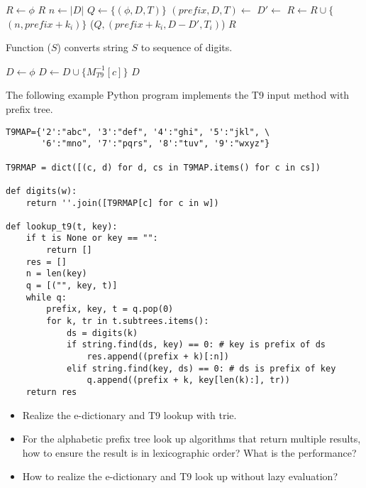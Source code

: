 \documentclass[b5paper]{article}
\begin{document}
\begin{algorithmic}[1]
  \State $R \gets \phi$
    \State \Return $R$
  \EndIf
  \State $n \gets |D|$
  \State $Q \gets \{(\phi, D, T)\}$
    \State $(prefix, D, T) \gets$ 
      \State $D' \gets$ 
       
        \State $R \gets R \cup \{$  $(n, prefix + k_i) \}$ 
        \State {}($Q, (prefix + k_i, D - D', T_i)$)
      \EndIf
    \EndFor
  \EndWhile
  \State \Return $R$
\EndFunction
\end{algorithmic}

Function ($S$) converts string $S$ to sequence of digits.

\begin{algorithmic}[1]
  \State $D \gets \phi$
    \State $D \gets D \cup \{M^{-1}_{T9}[c]\}$
  \EndFor
  \State \Return $D$
\EndFunction
\end{algorithmic}

The following example Python program implements the T9 input method with prefix tree.

\lstset{language=Python}
\begin{lstlisting}
T9MAP={'2':"abc", '3':"def", '4':"ghi", '5':"jkl", \
       '6':"mno", '7':"pqrs", '8':"tuv", '9':"wxyz"}

T9RMAP = dict([(c, d) for d, cs in T9MAP.items() for c in cs])

def digits(w):
    return ''.join([T9RMAP[c] for c in w])

def lookup_t9(t, key):
    if t is None or key == "":
        return []
    res = []
    n = len(key)
    q = [("", key, t)]
    while q:
        prefix, key, t = q.pop(0)
        for k, tr in t.subtrees.items():
            ds = digits(k)
            if string.find(ds, key) == 0: # key is prefix of ds
                res.append((prefix + k)[:n])
            elif string.find(key, ds) == 0: # ds is prefix of key
                q.append((prefix + k, key[len(k):], tr))
    return res
\end{lstlisting}


\begin{Exercise}
\begin{itemize}
\item Realize the e-dictionary and T9 lookup with trie.
\item For the alphabetic prefix tree look up algorithms that return multiple results, how to ensure the result is in lexicographic order? What is the performance?
\item How to realize the e-dictionary and T9 look up without lazy evaluation?
\end{itemize}
\end{Exercise}
\end{document}
